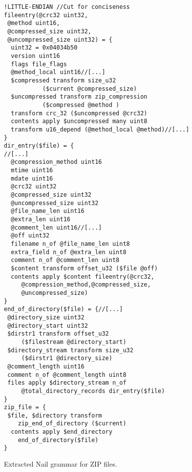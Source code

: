 \begin{figure}
\begin{verbatim}
!LITTLE-ENDIAN //Cut for conciseness
fileentry(@crc32 uint32,
 @method uint16,
 @compressed_size uint32, 
 @uncompressed_size uint32) = { 
  uint32 = 0x04034b50
  version uint16
  flags file_flags
  @method_local uint16//[...]
  $compressed transform size_u32 
           ($current @compressed_size)
  $uncompressed transform zip_compression 
           ($compressed @method )
  transform crc_32 ($uncompressed @crc32)
  contents apply $uncompressed many uint8
  transform u16_depend (@method_local @method)//[...]
}
dir_entry($file) = {
//[...]  
  @compression_method uint16      
  mtime uint16
  mdate uint16
  @crc32 uint32
  @compressed_size uint32
  @uncompressed_size uint32
  @file_name_len uint16
  @extra_len uint16
  @comment_len uint16//[...]
  @off uint32
  filename n_of @file_name_len uint8
  extra_field n_of @extra_len uint8
  comment n_of @comment_len uint8
  $content transform offset_u32 ($file @off)
  contents apply $content fileentry(@crc32,
     @compression_method,@compressed_size, 
     @uncompressed_size)
}
end_of_directory($file) = {//[...]
 @directory_size uint32 
 @directory_start uint32
 $dirstr1 transform offset_u32 
     ($filestream @directory_start) 
 $directory_stream transform size_u32 
     ($dirstr1 @directory_size)
 @comment_length uint16
 comment n_of @comment_length uint8
 files apply $directory_stream n_of 
     @total_directory_records dir_entry($file)
}
zip_file = { 
 $file, $directory transform 
    zip_end_of_directory ($current)
  contents apply $end_directory
    end_of_directory($file)
}
\end{verbatim}
\caption{Extracted Nail grammar for ZIP files.}
\label{fig:zip-extract}
\end{figure}
